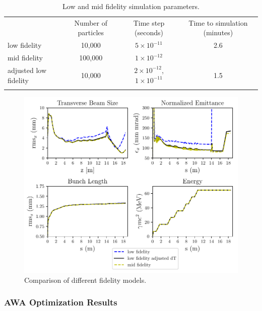 \begin{table}[h!]
	\begin{center}
		\caption{Low and mid fidelity simulation parameters.}
		\label{fidelity}
		\begin{tabular}{l ccc}
			\hline\noalign{\smallskip}
			 & Number of particles & Time step (seconds) & Time to simulation (minutes)\\
			\noalign{\smallskip}\hline\noalign{\smallskip}
			low fidelity  			&  10,000   & $5 \times10^{-11}$  &  2.6 \\
			mid fidelity 			&  100,000  & $1 \times 10^{-12}$ &  \\
			adjusted low fidelity  	&  10,000   & $2 \times 10^{-12}$, $1 \times 10^{-11}$ & 1.5 \\
			\noalign{\smallskip}\hline
		\end{tabular}
	\end{center}
\end{table}

\begin{figure}
	\centering
	\includegraphics[width=0.8\linewidth]{Report/timestep_comparison}
	\caption{Comparison of different fidelity models.}
	\label{tstep}
\end{figure}


\subsubsection{AWA Optimization Results}


